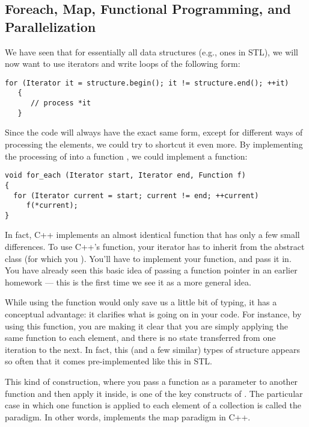 \subsection{Foreach, Map, Functional Programming, and Parallelization}
We have seen that for essentially all data structures (e.g., ones in
STL), we will now want to use iterators and write loops of the
following form:

\begin{verbatim}
for (Iterator it = structure.begin(); it != structure.end(); ++it)
   { 
      // process *it
   }
\end{verbatim}

Since the code will always have the exact same form, except for
different ways of processing the elements, we could try to shortcut it
even more. By implementing the processing of  into a
function , we could implement a function:
\begin{verbatim}
void for_each (Iterator start, Iterator end, Function f)
{
  for (Iterator current = start; current != end; ++current)
     f(*current);
}
\end{verbatim}

In fact, C++ implements an almost identical function that has only a
few small differences. To use C++'s function, your iterator has to
inherit from the abstract class  (for which you 
). You'll have to implement your function,
and pass it in. You have already seen this basic idea of passing a
function pointer in an earlier homework --- this is the first time we
see it as a more general idea.

While using the  function would only save us a little bit of
typing, it has a conceptual advantage: it clarifies what is going
on in your code. For instance, by using this function, you are making
it clear that you are simply applying the same function to each
element, and there is no state transferred from one iteration to the
next. In fact, this (and a few similar) types of structure appears so
often that it comes pre-implemented like this in STL.

This kind of construction, where you pass a function as a parameter to
another function and then apply it inside, is one of the key
constructs of . 
The particular case in which one function is applied to each element
of a collection is called the  paradigm. In other words,
 implements the map paradigm in C++.

